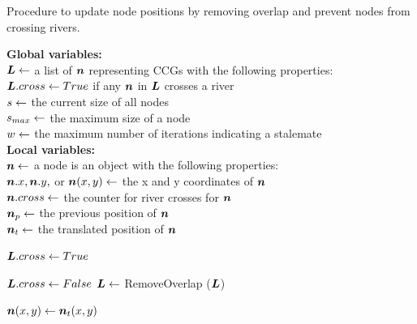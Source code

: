 \begin{algorithm}[tb!]
    \caption{Procedure to update node positions by removing overlap and prevent nodes from crossing rivers.}\label{alg:UpdateNodePosition}
    \textbf{Global variables:} \\
    $ \bm{L} \gets $ a list of $ \bm{n} $ representing CCGs with the following properties: \\
    \-\hspace{1em} $ \bm{L}.cross \gets True $ if any $ \bm{n} $ in $ \bm{L} $ crosses a river \\
    $ s \gets $ the current size of all nodes \\
    $ s_{max} \gets $ the maximum size of a node \\
    $ w \gets $ the maximum number of iterations indicating a stalemate \\

    \textbf{Local variables:} \\
    $ \bm{n} \gets $ a node is an object with the following properties: \\
    \-\hspace{1em} $ \bm{n}.x, \bm{n}.y, $ or $ \bm{n}(x,y) \gets $ the x and y coordinates of $ \bm{n} $ \\
    \-\hspace{1em} $ \bm{n}.cross \gets $ the counter for river crosses for $ \bm{n} $ \\
    \-\hspace{1em} $ \bm{n}_{p} \gets $ the previous position of $ \bm{n} $ \\
    \-\hspace{1em} $ \bm{n}_t \gets $ the translated position of $ \bm{n} $ \\


    \begin{algorithmic}[1]
        \While{$ \nodeSize < \nodeSizeMax $}
            \State $ \bm{L}.cross \gets True $

                \State $ \bm{L}.cross \gets False $
                \State $ \bm{L} \gets $ RemoveOverlap ($ \bm{L} $)

                \ForEach {$ \node \in \nodeList $}

                        
                        \State $ \bm{n}(x,y) \gets \bm{n}_t(x,y) $


\end{algorithmic}
\end{algorithm}
